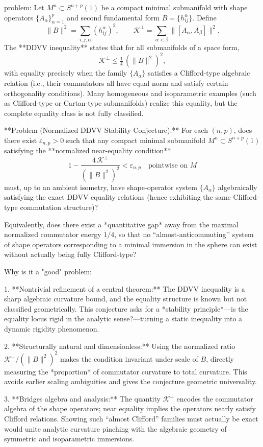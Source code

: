 problem:  
Let \(M^n\subset S^{n+p}(1)\) be a compact minimal submanifold with shape operators \(\{A_\alpha\}_{\alpha=1}^p\) and second fundamental form \(B=\{h_{ij}^\alpha\}\).  
Define
\[
\|B\|^2=\sum_{i,j,\alpha}(h_{ij}^\alpha)^2,\qquad 
\mathcal{K}^\perp=\sum_{\alpha<\beta}\|[A_\alpha,A_\beta]\|^2.
\]
The **DDVV inequality** states that for all submanifolds of a space form,
\[
\mathcal{K}^\perp \le \tfrac14\,(\|B\|^2)^2,
\]
with equality precisely when the family \(\{A_\alpha\}\) satisfies a Clifford-type algebraic relation (i.e., their commutators all have equal norm and satisfy certain orthogonality conditions).  Many homogeneous and isoparametric examples (such as Clifford-type or Cartan-type submanifolds) realize this equality, but the complete equality class is not fully classified.

**Problem (Normalized DDVV Stability Conjecture):**  
For each \((n,p)\), does there exist \(\varepsilon_{n,p}>0\) such that any compact minimal submanifold \(M^n\subset S^{n+p}(1)\) satisfying the **normalized near-equality condition**
\[
1-\frac{4\,\mathcal{K}^\perp}{(\|B\|^2)^2}<\varepsilon_{n,p}
\quad\text{pointwise on }M
\]
must, up to an ambient isometry, have shape-operator system \(\{A_\alpha\}\) algebraically satisfying the exact DDVV equality relations (hence exhibiting the same Clifford-type commutation structure)?  

Equivalently, does there exist a *quantitative gap* away from the maximal normalized commutator energy \(1/4\), so that no “almost-anticommuting’’ system of shape operators corresponding to a minimal immersion in the sphere can exist without actually being fully Clifford-type?

Why is it a "good" problem:  

1. **Nontrivial refinement of a central theorem:**  
   The DDVV inequality is a sharp algebraic curvature bound, and the equality structure is known but not classified geometrically.  This conjecture asks for a *stability principle*—is the equality locus rigid in the analytic sense?—turning a static inequality into a dynamic rigidity phenomenon.

2. **Structurally natural and dimensionless:**  
   Using the normalized ratio \(\mathcal{K}^\perp/(\|B\|^2)^2\) makes the condition invariant under scale of \(B\), directly measuring the *proportion* of commutator curvature to total curvature.  This avoids earlier scaling ambiguities and gives the conjecture geometric universality.

3. **Bridges algebra and analysis:**  
   The quantity \(\mathcal{K}^\perp\) encodes the commutator algebra of the shape operators; near equality implies the operators nearly satisfy Clifford relations.  Showing such “almost Clifford” families must actually be exact would unite analytic curvature pinching with the algebraic geometry of symmetric and isoparametric immersions.

